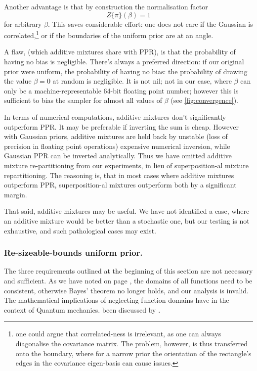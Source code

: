 \documentclass[usenatbib]{mnras}
\begin{document}
Another advantage is that by construction the normalisation factor
\[Z \{ \pi\}(\beta) = 1\] for arbitrary \(\beta\). This saves
considerable effort: one does not care if the Gaussian is
correlated,\footnote{one could argue that correlated-ness is irrelevant,
as one can always diagonalise the covariance matrix. The problem,
however, is thus transferred onto the boundary, where for a narrow
prior the orientation of the rectangle's edges in the covariance
eigen-basis can cause issues.} or if the boundaries of the
uniform prior are at an angle.

A flaw, (which additive mixtures share with PPR), is that the
probability of having no bias is negligible. There's always a
preferred direction: if our original prior were uniform, the
probability of having no bias: the probability of drawing the
value \(\beta=0\) at random is negligible. It is not nil; not in our
case, where \(\beta\) can only be a machine-representable 64-bit
floating point number; however this is sufficient to bias the
sampler for almost all values of \(\beta\) (see
\autoref{fig:convergence}).

In terms of numerical computations, additive mixtures don't
significantly outperform PPR. It may be preferable if inverting
the sum is cheap. However with Gaussian priors, additive mixtures
are held back by unstable (loss of precision in floating point
operations) expensive numerical inversion, while Gaussian PPR can
be inverted analytically. Thus we have omitted additive mixture
re-partitioning from our experiments, in lieu of superposition-al
mixture repartitioning. The reasoning is, that in most cases where
additive mixtures outperform PPR, superposition-al mixtures
outperform both by a significant margin.

That said, additive mixtures may be useful. We have not identified
a case, where an additive mixture would be better than a
stochastic one, but our testing is not exhaustive, and such
pathological cases may exist.

\subsubsection{Re-sizeable-bounds uniform prior.}
\label{sec:org6063b33}

The three requirements outlined at the beginning of this section
are not necessary and sufficient. As we have noted on page
\pageref{domain-discussion}, the domains of all functions need to be
consistent, otherwise Bayes' theorem no longer holds, and our
analysis is invalid. The mathematical implications of neglecting
function domains have in the context of Quantum mechanics. been
discussed by \cite{Gieres_2000}.
\end{document}
